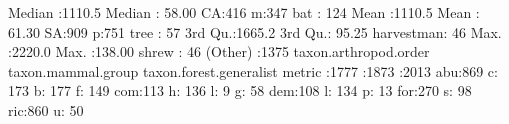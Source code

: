 \documentclass[11pt, a4paper]{article}
\begin{document}
\begin{Schunk}
\begin{Soutput}
 Median :1110.5   Median : 58.00   CA:416    m:347   bat       : 124  
 Mean   :1110.5   Mean   : 61.30   SA:909    p:751   tree      :  57  
 3rd Qu.:1665.2   3rd Qu.: 95.25                     harvestman:  46  
 Max.   :2220.0   Max.   :138.00                     shrew     :  46  
                                                     (Other)   :1375  
 taxon.arthropod.order taxon.mammal.group taxon.forest.generalist metric   
  :1777                 :1873              :2013                  abu:869  
 c: 173                b: 177             f: 149                  com:113  
 h: 136                l:   9             g:  58                  dem:108  
 l: 134                p:  13                                     for:270  
                       s:  98                                     ric:860  
                       u:  50                                              
                                                                           

\end{Soutput}
\end{Schunk}
\end{document}
